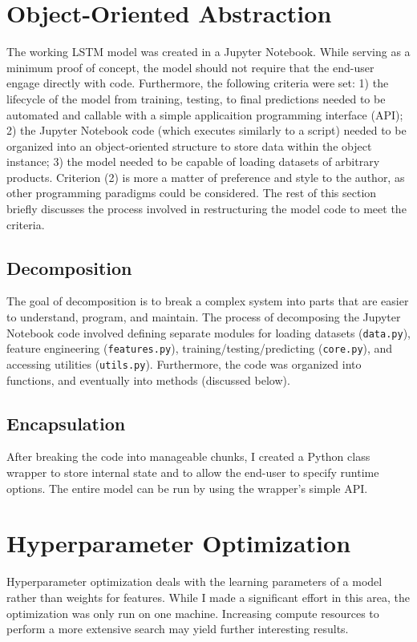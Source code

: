 \documentclass[11pt, oneside, authoryear]{report}
\begin{document}
\section{Object-Oriented Abstraction}
The working LSTM model was created in a Jupyter Notebook. While serving as a minimum proof of concept, the model should not require that the end-user engage directly with code. Furthermore, the following criteria were set: 1) the lifecycle of the model from training, testing, to final predictions needed to be automated and callable with a simple applicaition programming interface (API); 2) the Jupyter Notebook code (which executes similarly to a script) needed to be organized into an object-oriented structure to store data within the object instance; 3) the model needed to be capable of loading datasets of arbitrary products. Criterion (2) is more a matter of preference and style to the author, as other programming paradigms could be considered. The rest of this section briefly discusses the process involved in restructuring the model code to meet the criteria.

\subsection{Decomposition}
The goal of decomposition is to break a complex system into parts that are easier to understand, program, and maintain. The process of decomposing the Jupyter Notebook code involved defining separate modules for loading datasets (\texttt{data.py}), feature engineering (\texttt{features.py}), training/testing/predicting (\texttt{core.py}), and accessing utilities (\texttt{utils.py}). Furthermore, the code was organized into functions, and eventually into methods (discussed below).

\subsection{Encapsulation}
After breaking the code into manageable chunks, I created a Python class wrapper to store internal state and to allow the end-user to specify runtime options. The entire model can be run by using the wrapper's simple API.

\section{Hyperparameter Optimization}
Hyperparameter optimization deals with the learning parameters of a model rather than weights for features. While I made a significant effort in this area, the optimization was only run on one machine. Increasing compute resources to perform a more extensive search may yield further interesting results.
\end{document}
